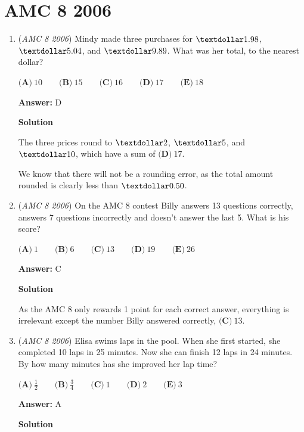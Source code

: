 \section{AMC 8 2006}
        \begin{enumerate}
        	\item (\textit{AMC 8 2006}) Mindy made three purchases for $\textdollar 1.98$, $\textdollar 5.04$, and $\textdollar 9.89$. What was her total, to the nearest dollar? 


 $\textbf{(A)}\ 10\qquad\textbf{(B)}\ 15\qquad\textbf{(C)}\ 16\qquad\textbf{(D)}\ 17\qquad\textbf{(E)}\ 18$

 \textbf{Answer: }D



\textbf{Solution}

The three prices round to $\textdollar 2$, $\textdollar 5$, and $\textdollar 10$, which have a sum of $\boxed{\textbf{(D)}\ 17}$.

 We know that there will not be a rounding error, as the total amount rounded is clearly less than $\textdollar 0.50$.

 


	\item (\textit{AMC 8 2006}) On the AMC 8 contest Billy answers 13 questions correctly, answers 7 questions incorrectly and doesn't answer the last 5. What is his score?


 $\textbf{(A)}\ 1\qquad\textbf{(B)}\ 6\qquad\textbf{(C)}\ 13\qquad\textbf{(D)}\ 19\qquad\textbf{(E)}\ 26$

 \textbf{Answer: }C



\textbf{Solution}

As the AMC 8 only rewards 1 point for each correct answer, everything is irrelevant except the number Billy answered correctly, $\boxed{\textbf{(C)}\ 13}$.

 


	\item (\textit{AMC 8 2006}) Elisa swims laps in the pool. When she first started, she completed 10 laps in 25 minutes. Now she can finish 12 laps in 24 minutes. By how many minutes has she improved her lap time?


 $\textbf{(A)}\ \frac{1}{2}\qquad\textbf{(B)}\ \frac{3}{4}\qquad\textbf{(C)}\ 1\qquad\textbf{(D)}\ 2\qquad\textbf{(E)}\ 3$

 \textbf{Answer: }A



\textbf{Solution}


\end{enumerate}

